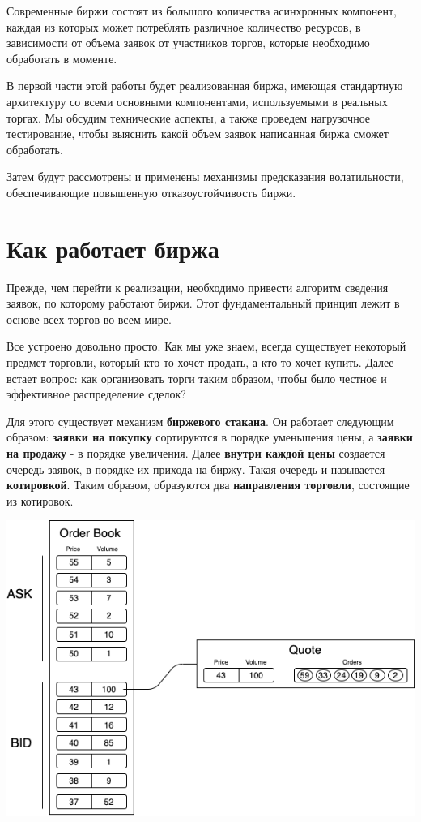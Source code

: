 Современные биржи состоят из большого количества асинхронных компонент, каждая из которых может потреблять различное количество ресурсов, в зависимости от объема заявок от участников торгов, которые необходимо обработать в моменте.

В первой части этой работы будет реализованная биржа, имеющая стандартную архитектуру со всеми основными компонентами, используемыми в реальных торгах. Мы обсудим технические аспекты, а также проведем нагрузочное тестирование, чтобы выяснить какой объем заявок написанная биржа сможет обработать.

Затем будут рассмотрены и применены механизмы предсказания волатильности, обеспечивающие повышенную отказоустойчивость биржи. 

  
\section{Как работает биржа}

Прежде, чем перейти к реализации, необходимо привести алгоритм сведения заявок, по которому работают биржи. Этот фундаментальный принцип лежит в основе всех торгов во всем мире.

Все устроено довольно просто. Как мы уже знаем, всегда существует некоторый предмет торговли, который кто-то хочет продать, а кто-то хочет купить. Далее встает вопрос: как организовать торги таким образом, чтобы было честное и эффективное распределение сделок?
\newpage

Для этого существует механизм \textbf{биржевого стакана}. Он работает следующим образом: \textbf{заявки на покупку} сортируются в порядке уменьшения цены, а \textbf{заявки на продажу} - в порядке увеличения. Далее \textbf{внутри каждой цены} создается очередь заявок, в порядке их прихода на биржу. Такая очередь и называется \textbf{котировкой}. Таким образом, образуются два \textbf{направления торговли}, состоящие из котировок.


\begin{center}
\includegraphics[width=450pt]{images/order_book_schema.png}
\end{center}

